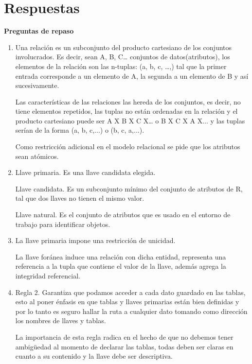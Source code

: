 \documentclass{exam}
\begin{document}
\section*{Respuestas}
\begin{questions}
	\question \textbf{Preguntas de repaso}
	
	\begin{enumerate}[label=(\roman*)]
	    \item Una relación es un subconjunto del producto cartesiano de los conjuntos involucrados. Es decir, sean A, B, C… conjuntos de datos(atributos), los elementos de la relación son las n-tuplas: (a, b, c, …,) tal que la primer entrada corresponde a un elemento de A, la segunda a un elemento de B y así sucesivamente.
	    
	    Las características de las relaciones las hereda de los conjuntos, es decir, no tiene elementos repetidos, las tuplas no están ordenadas en la relación y el producto cartesiano puede ser A X B X C X… o B X C X A X... y las tuplas serían de la forma (a, b, c,...) o (b, c, a,...). 

        Como restricción adicional en el modelo relacional se pide que los atributos sean atómicos.

	    \item Llave primaria. Es una llave candidata elegida.
	    
        Llave candidata. Es un subconjunto mínimo del conjunto de atributos de R, tal que dos llaves no tienen el mismo valor.
        
        Llave natural. Es el conjunto de atributos que es usado en el entorno de trabajo para identificar objetos.
        
        \item La llave primaria impone una restricción de unicidad.
        
        La llave foránea induce una relación con dicha entidad, representa una referencia a la tupla que contiene el valor de la llave, además agrega la integridad referencial.
        
        \item 
        
        Regla 2. Garantiza que podamos acceder a cada dato guardado en las tablas, esto al poner énfasis en que tablas y llaves primarias están bien definidas y por lo tanto es seguro hallar la ruta a cualquier dato tomando como dirección los nombres de llaves y tablas.
        
        La importancia de esta regla radica en el hecho de que no debemos tener ambigüedad al momento de declarar las tablas, todas deben ser claras en cuanto a su contenido y la llave debe ser descriptiva.
        

\end{enumerate}
\end{questions}
\end{document}
